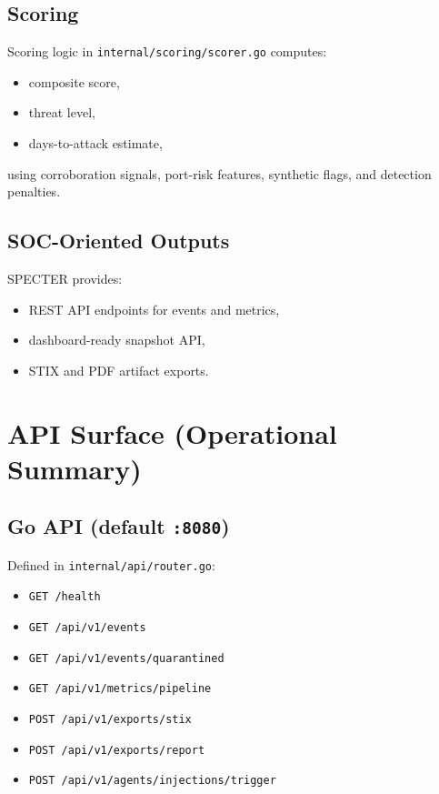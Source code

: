 \documentclass[11pt,a4paper]{article}
\begin{document}
\subsection{Scoring}
Scoring logic in \texttt{internal/scoring/scorer.go} computes:
\begin{itemize}[leftmargin=1.5em]
    \item composite score,
    \item threat level,
    \item days-to-attack estimate,
\end{itemize}
using corroboration signals, port-risk features, synthetic flags, and detection penalties.

\subsection{SOC-Oriented Outputs}
SPECTER provides:
\begin{itemize}[leftmargin=1.5em]
    \item REST API endpoints for events and metrics,
    \item dashboard-ready snapshot API,
    \item STIX and PDF artifact exports.
\end{itemize}

\section{API Surface (Operational Summary)}

\subsection{Go API (default \texttt{:8080})}
Defined in \texttt{internal/api/router.go}:
\begin{itemize}[leftmargin=1.5em]
    \item \texttt{GET /health}
    \item \texttt{GET /api/v1/events}
    \item \texttt{GET /api/v1/events/quarantined}
    \item \texttt{GET /api/v1/metrics/pipeline}
    \item \texttt{POST /api/v1/exports/stix}
    \item \texttt{POST /api/v1/exports/report}
    \item \texttt{POST /api/v1/agents/injections/trigger}
\end{itemize}
\end{document}
